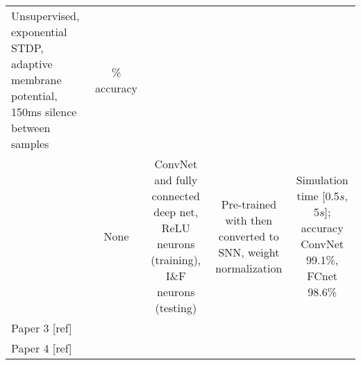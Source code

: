 \begin{table*}[hbt!]
\begin{center}
\begin{tabular}{ l  c c c c }
       \begin{minipage}{3.5cm}\centering  Unsupervised, exponential STDP, adaptive membrane potential, 150ms silence between samples \end{minipage} & 
       \begin{minipage}{3.5cm}\centering 95\% accuracy \end{minipage}\\
      \begin{minipage}{3cm} \cite{Diehl2015fast}\end{minipage}  & 
      \centering None & 
      \begin{minipage}{3.5cm}\centering ConvNet and fully connected deep net, ReLU neurons (training), I\&F neurons (testing) \end{minipage}& 
      \begin{minipage}{3.5cm}\centering Pre-trained with then converted to SNN, weight normalization \end{minipage}&  
      \begin{minipage}{3.5cm}\centering Simulation time [0.5$s$, 5$s$]; accuracy ConvNet 99.1\%, FCnet 98.6\%\end{minipage}\\
      \begin{minipage}{3cm} Paper 3 [ref]\end{minipage}  & 
      \centering & 
      \begin{minipage}{3.5cm}\centering  \end{minipage}& 
      \begin{minipage}{3.5cm}\centering  \end{minipage}&  
      \begin{minipage}{3.5cm}\centering  \end{minipage}\\
      \begin{minipage}{3cm} Paper 4 [ref]\end{minipage}  
      \centering & 
      \begin{minipage}{3.5cm}\centering  \end{minipage}& 
      \begin{minipage}{3.5cm}\centering  \end{minipage}& 
      \begin{minipage}{3.5cm}\centering  \end{minipage}&
      \begin{minipage}{3.5cm}\centering  \end{minipage}  
    \end{tabular}
    \egroup
  \end{center}
  \label{tb:software_comparison}
\end{table*}

